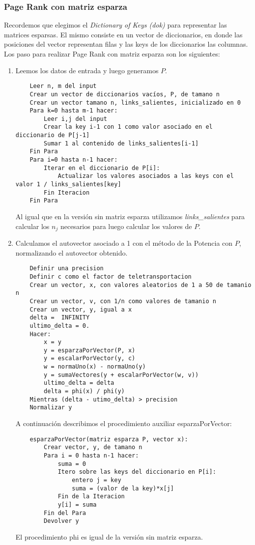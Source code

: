 \subsubsection{Page Rank con matriz esparza}\label{imp_esparza}
Recordemos que elegimos el \textit{Dictionary of Keys (dok)} para representar las matrices esparsas. El mismo consiste en un vector de diccionarios, en donde las posiciones del vector representan filas y las keys de los diccionarios las columnas.
Los paso para realizar Page Rank con matriz esparza son los siguientes:
\begin{enumerate}
	\item Leemos los datos de entrada y luego generamos $P$.
	\begin{lstlisting}
	Leer n, m del input
	Crear un vector de diccionarios vacíos, P, de tamano n
	Crear un vector tamano n, links_salientes, inicializado en 0
	Para k=0 hasta m-1 hacer:
		Leer i,j del input
		Crear la key i-1 con 1 como valor asociado en el diccionario de P[j-1]
		Sumar 1 al contenido de links_salientes[i-1]
	Fin Para
	Para i=0 hasta n-1 hacer:
		Iterar en el diccionario de P[i]:
			Actualizar los valores asociados a las keys con el valor 1 / links_salientes[key]
		Fin Iteracion
	Fin Para
	\end{lstlisting}
	Al igual que en la versión sin matriz esparza utilizamos \textit{links_salientes} para calcular los $n_j$ necesarios para luego calcular los valores de $P$.

	\item Calculamos el autovector asociado a 1 con el método de la Potencia con $P$, normalizando el autovector obtenido.
	\begin{lstlisting}
	Definir una precision
	Definir c como el factor de teletransportacion
	Crear un vector, x, con valores aleatorios de 1 a 50 de tamanio n
	Crear un vector, v, con 1/n como valores de tamanio n
	Crear un vector, y, igual a x
	delta =  INFINITY
	ultimo_delta = 0.
	Hacer:
		x = y
		y = esparzaPorVector(P, x)
		y = escalarPorVector(y, c)
		w = normaUno(x) - normaUno(y)
		y = sumaVectores(y + escalarPorVector(w, v))
		ultimo_delta = delta
		delta = phi(x) / phi(y)
	Mientras (delta - utimo_delta) > precision
	Normalizar y
	\end{lstlisting}
	A continuación describimos el procedimiento auxiliar esparzaPorVector:
	\begin{lstlisting}
	esparzaPorVector(matriz esparza P, vector x):
		Crear vector, y, de tamano n
		Para i = 0 hasta n-1 hacer:
			suma = 0
			Itero sobre las keys del diccionario en P[i]:
				entero j = key
				suma = (valor de la key)*x[j]
			Fin de la Iteracion
			y[i] = suma
		Fin del Para
		Devolver y
	\end{lstlisting}
	El procedimiento phi es igual de la versión sin matriz esparza.


\end{enumerate}
